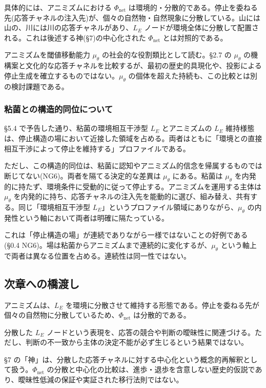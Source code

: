 具体的には、アニミズムにおける $\Phi_{\text{net}}$ は環境的・分散的である。停止を委ねる先(応答チャネルの注入先)が、個々の自然物・自然現象に分散している。山には山の、川には川の応答チャネルがあり、$L_E$ ノードが環境全体に分散して配置される。これは後述する神(\S{}7)の中心化された $\Phi_{\text{net}}$ とは対照的である。

アニミズムを閾値移動能力 $\mu_\theta$ の社会的な役割類比として読む。\S{}2.7 の $\mu_\theta$ の機構案と文化的な応答チャネルを比較するが、最初の歴史的具現化や、投影による停止生成を確立するものではない。$\mu_\theta$ の個体を超えた持続も、この比較とは別の検討課題である。

\subsubsection{粘菌との構造的同位について}


\S{}5.4 で予告した通り、粘菌の環境相互干渉型 $L_E$ とアニミズムの $L_E$ 維持様態は、停止構造の場において近接した領域を占める。両者はともに「環境との直接相互干渉によって停止を維持する」プロファイルである。

ただし、この構造的同位は、粘菌に認知やアニミズム的信念を帰属するものでは断じてない(NG6)。両者を隔てる決定的な差異は $\mu_\theta$ にある。粘菌は $\mu_\theta$ を内発的に持たず、環境条件に受動的に従って停止する。アニミズムを運用する主体は $\mu_\theta$ を内発的に持ち、応答チャネルの注入先を能動的に選び、組み替え、共有する。同じ「環境相互干渉型 $L_E$」というプロファイル領域にありながら、$\mu_\theta$ の内発性という軸において両者は明確に隔たっている。

これは「停止構造の場」が連続でありながら一様ではないことの好例である(\S{}0.4 NG6)。場は粘菌からアニミズムまで連続的に変化するが、$\mu_\theta$ という軸上で両者は異なる位置を占める。連続性は同一性ではない。

\bigskip


\subsection{次章への橋渡し}


アニミズムは、$L_E$ を環境に分散させて維持する形態である。停止を委ねる先が個々の自然物に分散しているため、$\Phi_{\text{net}}$ は分散的である。

分散した $L_E$ ノードという表現を、応答の競合や判断の曖昧性に関連づける。ただし、判断の不一致から主体の決定不能が必ず生じるという結果ではない。

\S{}7 の「神」は、分散した応答チャネルに対する中心化という概念的再解釈として扱う。$\Phi_{\text{net}}$ の分散と中心化の比較は、進歩・退歩を含意しない歴史的仮説であり、曖昧性低減の保証や実証された移行法則ではない。

